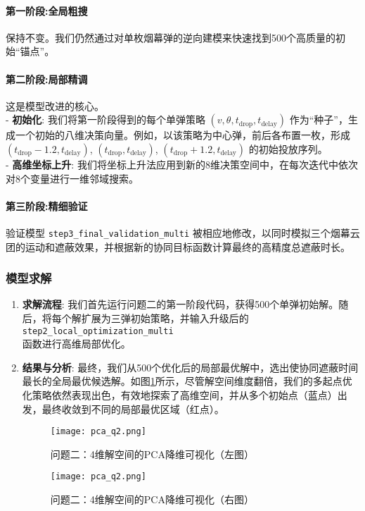 \documentclass[12pt]{article}
\newcommand{\code}[1]{\texttt{#1}} %
\begin{document}
\begin{CJK}{UTF8}{gbsn}
	\paragraph{第一阶段:全局粗搜} 保持不变。我们仍然通过对单枚烟幕弹的逆向建模来快速找到500个高质量的初始“锚点”。
	
		\paragraph{第二阶段:局部精调} 这是模型改进的核心。\\
	\indent - \textbf{初始化}: 我们将第一阶段得到的每个单弹策略 $(v, \theta, t_{\text{drop}}, t_{\text{delay}})$ 作为“种子”，生成一个初始的八维决策向量。例如，以该策略为中心弹，前后各布置一枚，形成 $(t_{\text{drop}}-1.2, t_{\text{delay}})$, $(t_{\text{drop}}, t_{\text{delay}})$, $(t_{\text{drop}}+1.2, t_{\text{delay}})$ 的初始投放序列。\\
	\indent - \textbf{高维坐标上升}: 我们将坐标上升法应用到新的8维决策空间中，在每次迭代中依次对8个变量进行一维邻域搜索。
	
		\paragraph{第三阶段:精细验证} 验证模型 \code{step3\_final\_validation\_multi} 被相应地修改，以同时模拟三个烟幕云团的运动和遮蔽效果，并根据新的协同目标函数计算最终的高精度总遮蔽时长。
	
	
	\subsubsection{模型求解}
	\begin{enumerate}
		\item \textbf{求解流程}: 我们首先运行问题二的第一阶段代码，获得500个单弹初始解。随后，将每个解扩展为三弹初始策略，并输入升级后的\code{step2\_local\_optimization\_multi}\\函数进行高维局部优化。
		
		\item \textbf{结果与分析}: 最终，我们从500个优化后的局部最优解中，选出使协同遮蔽时间最长的全局最优候选解。如图\ref{fig:3}所示，尽管解空间维度翻倍，我们的多起点优化策略依然表现出色，有效地探索了高维空间，并从多个初始点（蓝点）出发，最终收敛到不同的局部最优区域（红点）。
		
		\begin{figure}[H]
			\centering
			\begin{minipage}{0.48\textwidth}
				\centering
				\texttt{[image: pca\_q2.png]} %
				\caption{问题二：4维解空间的PCA降维可视化（左图）}
				\label{fig:4}
			\end{minipage}
			\hfill %
			\begin{minipage}{0.48\textwidth}
				\centering
				\texttt{[image: pca\_q2.png]} %
				\caption{问题二：4维解空间的PCA降维可视化（右图）}
				\label{fig:3}
			\end{minipage}
		\end{figure}
		

\end{enumerate}
\end{CJK}
\end{document}
